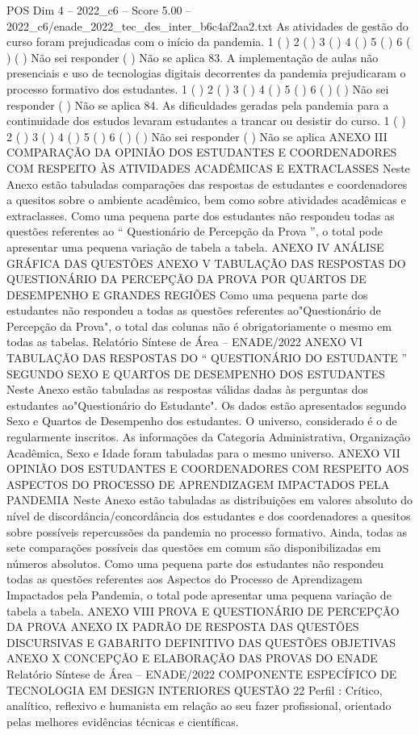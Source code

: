 \begin{textsample}{POS Dim 4 – 2022\_c6 – Score 5.00 – 2022\_c6/enade\_2022\_tec\_des\_inter\_b6c4af2aa2.txt}
As atividades de gestão do curso foram prejudicadas com o início da pandemia. 1 ( ) 2 ( ) 3 ( ) 4 ( ) 5 ( ) 6 ( ) ( ) Não sei responder ( ) Não se aplica 83.
A implementação de aulas não presenciais e uso de tecnologias digitais decorrentes da pandemia prejudicaram o processo formativo dos estudantes. 1 ( ) 2 ( ) 3 ( ) 4 ( ) 5 ( ) 6 ( ) ( ) Não sei responder ( ) Não se aplica 84.
As dificuldades geradas pela pandemia para a continuidade dos estudos levaram estudantes a trancar ou desistir do curso. 1 ( ) 2 ( ) 3 ( ) 4 ( ) 5 ( ) 6 ( ) ( ) Não sei responder ( ) Não se aplica ANEXO III COMPARAÇÃO DA OPINIÃO DOS ESTUDANTES E COORDENADORES COM RESPEITO ÀS ATIVIDADES ACADÊMICAS E EXTRACLASSES Neste Anexo estão tabuladas comparações das respostas de estudantes e coordenadores a quesitos sobre o ambiente acadêmico, bem como sobre atividades acadêmicas e extraclasses.
Como uma pequena parte dos estudantes não respondeu todas as questões referentes ao “ Questionário de Percepção da Prova ”, o total pode apresentar uma pequena variação de tabela a tabela.
ANEXO IV ANÁLISE GRÁFICA DAS QUESTÕES ANEXO V TABULAÇÃO DAS RESPOSTAS DO QUESTIONÁRIO DA PERCEPÇÃO DA PROVA POR QUARTOS DE DESEMPENHO E GRANDES REGIÕES Como uma pequena parte dos estudantes não respondeu a todas as questões referentes ao"Questionário de Percepção da Prova", o total das colunas não é obrigatoriamente o mesmo em todas as tabelas.
Relatório Síntese de Área – ENADE/2022 ANEXO VI TABULAÇÃO DAS RESPOSTAS DO “ QUESTIONÁRIO DO ESTUDANTE ” SEGUNDO SEXO E QUARTOS DE DESEMPENHO DOS ESTUDANTES Neste Anexo estão tabuladas as respostas válidas dadas às perguntas dos estudantes ao"Questionário do Estudante".
Os dados estão apresentados segundo Sexo e Quartos de Desempenho dos estudantes.
O universo, considerado é o de regularmente inscritos.
As informações da Categoria Administrativa, Organização Acadêmica, Sexo e Idade foram tabuladas para o mesmo universo.
ANEXO VII OPINIÃO DOS ESTUDANTES E COORDENADORES COM RESPEITO AOS ASPECTOS DO PROCESSO DE APRENDIZAGEM IMPACTADOS PELA PANDEMIA Neste Anexo estão tabuladas as distribuições em valores absoluto do nível de discordância/concordância dos estudantes e dos coordenadores a quesitos sobre possíveis repercussões da pandemia no processo formativo.
Ainda, todas as sete comparações possíveis das questões em comum são disponibilizadas em números absolutos.
Como uma pequena parte dos estudantes não respondeu todas as questões referentes aos Aspectos do Processo de Aprendizagem Impactados pela Pandemia, o total pode apresentar uma pequena variação de tabela a tabela.
ANEXO VIII PROVA E QUESTIONÁRIO DE PERCEPÇÃO DA PROVA ANEXO IX PADRÃO DE RESPOSTA DAS QUESTÕES DISCURSIVAS E GABARITO DEFINITIVO DAS QUESTÕES OBJETIVAS ANEXO X CONCEPÇÃO E ELABORAÇÃO DAS PROVAS DO ENADE Relatório Síntese de Área – ENADE/2022 COMPONENTE ESPECÍFICO DE TECNOLOGIA EM DESIGN INTERIORES QUESTÃO 22 Perfil : Crítico, analítico, reflexivo e humanista em relação ao seu fazer profissional, orientado pelas melhores evidências técnicas e científicas.

\end{textsample}
